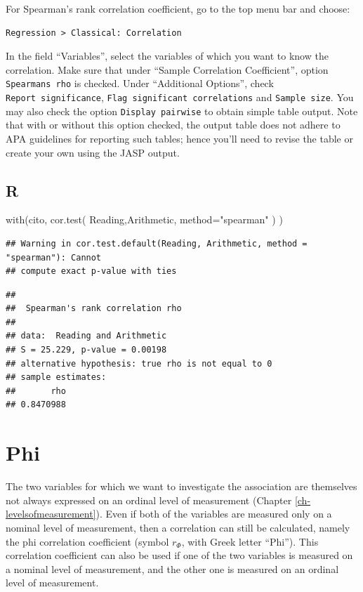 \documentclass[
]{book}
\newenvironment{Shaded}{\begin{snugshade}}{\end{snugshade}}
\newcommand{\AttributeTok}[1]{\textcolor[rgb]{0.77,0.63,0.00}{#1}}
\newcommand{\FunctionTok}[1]{\textcolor[rgb]{0.00,0.00,0.00}{#1}}
\newcommand{\NormalTok}[1]{#1}
\newcommand{\StringTok}[1]{\textcolor[rgb]{0.31,0.60,0.02}{#1}}
\begin{document}
For Spearman's rank correlation coefficient, go to the top menu bar and choose:

\begin{verbatim}
Regression > Classical: Correlation
\end{verbatim}

In the field ``Variables'', select the variables of which you want to know the correlation.
Make sure that under ``Sample Correlation Coefficient'', option \texttt{Spearman\textquotesingle{}s\ rho} is checked.
Under ``Additional Options'', check \texttt{Report\ significance}, \texttt{Flag\ significant\ correlations} and \texttt{Sample\ size}. You may also check the option \texttt{Display\ pairwise} to obtain simple table output.
Note that with or without this option checked, the output table does not adhere to APA guidelines for reporting such tables; hence you'll need to revise the table or create your own using the JASP output.

\hypertarget{r-9}{%
\subsection{R}\label{r-9}}

\begin{Shaded}
\begin{Highlighting}[]
\FunctionTok{with}\NormalTok{(cito, }\FunctionTok{cor.test}\NormalTok{( Reading,Arithmetic, }\AttributeTok{method=}\StringTok{"spearman"}\NormalTok{ ) )}
\end{Highlighting}
\end{Shaded}

\begin{verbatim}
## Warning in cor.test.default(Reading, Arithmetic, method = "spearman"): Cannot
## compute exact p-value with ties
\end{verbatim}

\begin{verbatim}
## 
##  Spearman's rank correlation rho
## 
## data:  Reading and Arithmetic
## S = 25.229, p-value = 0.00198
## alternative hypothesis: true rho is not equal to 0
## sample estimates:
##       rho 
## 0.8470988
\end{verbatim}

\hypertarget{sec:Phi}{%
\section{Phi}\label{sec:Phi}}

The two variables for which we want to investigate the association are themselves
not always expressed on an ordinal level of measurement (Chapter \ref{ch-levelsofmeasurement}).
Even if both of the variables are measured only on a nominal level of measurement,
then a correlation can still be calculated, namely the phi correlation coefficient
(symbol \(r_\Phi\), with Greek letter ``Phi''). This correlation coefficient can also be used
if one of the two variables is measured on a nominal level of measurement,
and the other one is measured on an ordinal level of measurement.
\end{document}
